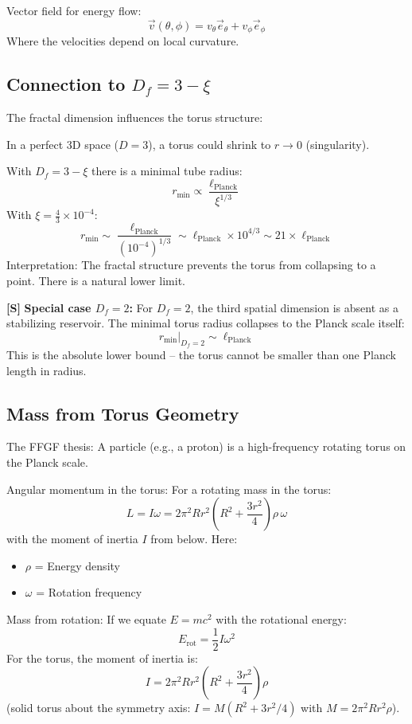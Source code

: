 Vector field for energy flow:
\[
\vec{v}(\theta, \phi) = v_\theta \vec{e}_\theta + v_\phi \vec{e}_\phi
\]
Where the velocities depend on local curvature.

\subsection{Connection to \( D_f = 3 - \xi \)}
The fractal dimension influences the torus structure:

In a perfect 3D space (\( D = 3 \)), a torus could shrink to \( r \to 0 \) (singularity).

With \( D_f = 3 - \xi \) there is a minimal tube radius:
\[
r_{\text{min}} \propto \frac{\ell_{\text{Planck}}}{\xi^{1/3}}
\]
With \( \xi = \frac{4}{3} \times 10^{-4} \):
\[
r_{\text{min}} \sim \frac{\ell_{\text{Planck}}}{(10^{-4})^{1/3}} \sim \ell_{\text{Planck}} \times 10^{4/3} \sim 21 \times \ell_{\text{Planck}}
\]
Interpretation: The fractal structure prevents the torus from collapsing to a point. There is a natural lower limit.

\textbf{[S]} \textbf{Special case \(D_f = 2\):}
For $D_f = 2$, the third spatial dimension is absent as a stabilizing reservoir. The minimal torus radius collapses to the Planck scale itself:
\[
r_{\text{min}}\big|_{D_f=2} \sim \ell_{\text{Planck}}
\]
This is the absolute lower bound -- the torus cannot be smaller than one Planck length in radius.

\subsection{Mass from Torus Geometry}
The FFGF thesis: A particle (e.g., a proton) is a high-frequency rotating torus on the Planck scale.

Angular momentum in the torus:
For a rotating mass in the torus:
\[
L = I\omega = 2\pi^2 R r^2 \left(R^2 + \frac{3r^2}{4}\right) \rho\, \omega
\]
with the moment of inertia $I$ from below. Here:
\begin{itemize}
	\item \( \rho \) = Energy density
	\item \( \omega \) = Rotation frequency
\end{itemize}

Mass from rotation:
If we equate \( E = mc^2 \) with the rotational energy:
\[
E_{\text{rot}} = \frac{1}{2} I \omega^2
\]
For the torus, the moment of inertia is:
\[
I = 2\pi^2 R r^2 \left(R^2 + \frac{3r^2}{4}\right) \rho
\]
(solid torus about the symmetry axis: $I = M(R^2 + 3r^2/4)$ with $M = 2\pi^2 R r^2 \rho$).

